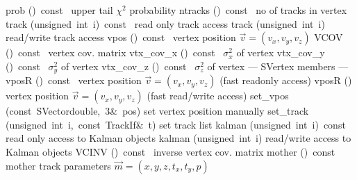 \documentclass{article}
\begin{document}
\begin{cxxentry}
\begin{cxxclass}
\begin{cxxpublic}
        {prob}
        {()\ const\ }
        { upper tail $\chi^2$ probability}
        {}
\label{cxx.2.1.19}
        {ntracks}
        {()\ const\ }
        { no of tracks in vertex}
        {}
\label{cxx.2.1.20}
        {track}
        {(unsigned\ int\ i)\ const\ }
        { read only track access}
        {}
\label{cxx.2.1.21}
        {track}
        {(unsigned\ int\ i)}
        { read/write track access}
        {}
\label{cxx.2.1.22}
        {vpos}
        {()\ const\ }
        { vertex position $\vec{v} = (v_x,v_y,v_z)$}
        {}
\label{cxx.2.1.23}
        {VCOV}
        {()\ const\ }
        { vertex cov. matrix}
        {}
\label{cxx.2.1.24}
        {vtx\_cov\_x}
        {()\ const\ }
        { $\sigma_x^2$ of vertex}
        {}
\label{cxx.2.1.25}
        {vtx\_cov\_y}
        {()\ const\ }
        { $\sigma_y^2$ of vertex}
        {}
\label{cxx.2.1.26}
        {vtx\_cov\_z}
        {()\ const\ }
        { $\sigma_z^2$ of vertex}
        {}
\label{cxx.2.1.27}
\cxxitem{}
        {--- SVertex members --- }
        {}
        {}
        {}
\label{cxx.2.1.28}
        {vposR}
        {()\ const\ }
        { vertex position $\vec{v} = (v_x,v_y,v_z)$ (fast readonly access)}
        {}
\label{cxx.2.1.29}
        {vposR}
        {()}
        { vertex position $\vec{v} = (v_x,v_y,v_z)$ (fast read/write access)}
        {}
\label{cxx.2.1.30}
        {set\_vpos}
        {(const\ SVector\<double,\ 3\>\&\ pos)}
        { set vertex position manually}
        {}
\label{cxx.2.1.31}
        {set\_track}
        {(unsigned\ int\ i,\ const\ TrackIf\&\ t)}
        { set track list}
        {}
\label{cxx.2.1.32}
        {kalman}
        {(unsigned\ int\ i)\ const\ }
        { read only access to Kalman objects}
        {}
\label{cxx.2.1.33}
        {kalman}
        {(unsigned\ int\ i)}
        { read/write access to Kalman objects}
        {}
\label{cxx.2.1.34}
        {VCINV}
        {()\ const\ }
        { inverse vertex cov. matrix}
        {}
\label{cxx.2.1.35}
        {mother}
        {()\ const\ }
        { mother track parameters $\vec{m}=(x,y,z,t_x,t_y,p)$}

\end{cxxpublic}
\end{cxxclass}
\end{cxxentry}
\end{document}
